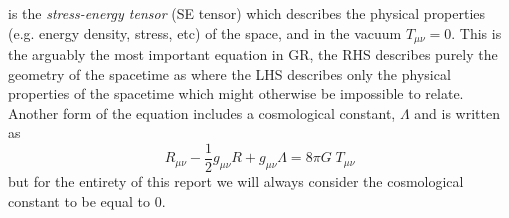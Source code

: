 \documentclass[12pt]{article}
\numberwithin{equation}{section}
\numberwithin{figure}{section}
\begin{document}
is the \emph{stress-energy tensor} (SE tensor) which describes the physical properties (e.g. energy density, stress, etc) of the space, and in the vacuum $T_{\mu\nu} = 0$. This is the arguably the most important equation in GR, the RHS describes purely the geometry of the spacetime as where the LHS describes only the physical properties of the spacetime which might otherwise be impossible to relate.
Another form of the equation includes a cosmological constant, $\Lambda$ and is written as
\begin{equation}
	R_{\mu\nu} - \frac{1}{2}g_{\mu\nu}R +g_{\mu\nu}\Lambda= 8\pi G\; T_{\mu\nu}
\end{equation}
but for the entirety of this report we will always consider the cosmological constant to be equal to 0.
\end{document}

